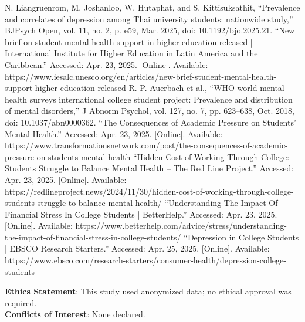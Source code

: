 \documentclass[conference]{IEEEtran}
\begin{document}
\begin{thebibliography}{00}

 N. Liangruenrom, M. Joshanloo, W. Hutaphat, and S. Kittisuksathit, “Prevalence and correlates of depression among Thai university students: nationwide study,” BJPsych Open, vol. 11, no. 2, p. e59, Mar. 2025, doi: 10.1192/bjo.2025.21.
“New brief on student mental health support in higher education released | International Institute for Higher Education in Latin America and the Caribbean.” Accessed: Apr. 23, 2025. [Online]. Available: https://www.iesalc.unesco.org/en/articles/new-brief-student-mental-health-support-higher-education-released
 R. P. Auerbach et al., “WHO world mental health surveys international college student project: Prevalence and distribution of mental disorders,” J Abnorm Psychol, vol. 127, no. 7, pp. 623–638, Oct. 2018, doi: 10.1037/abn0000362.
 “The Consequences of Academic Pressure on Students’ Mental Health.” Accessed: Apr. 23, 2025. [Online]. Available: https://www.transformationsnetwork.com/post/the-consequences-of-academic-pressure-on-students-mental-health
 “Hidden Cost of Working Through College: Students Struggle to Balance Mental Health – The Red Line Project.” Accessed: Apr. 23, 2025. [Online]. Available: https://redlineproject.news/2024/11/30/hidden-cost-of-working-through-college-students-struggle-to-balance-mental-health/
 “Understanding The Impact Of Financial Stress In College Students | BetterHelp.” Accessed: Apr. 23, 2025. [Online]. Available: https://www.betterhelp.com/advice/stress/understanding-the-impact-of-financial-stress-in-college-students/
 “Depression in College Students | EBSCO Research Starters.” Accessed: Apr. 25, 2025. [Online]. Available: https://www.ebsco.com/research-starters/consumer-health/depression-college-students
 
\end{thebibliography}
\vspace{12pt} 

\textbf{Ethics Statement}: This study used anonymized data; no ethical approval was required. \\
\textbf{Conflicts of Interest}: None declared.
\end{document}
